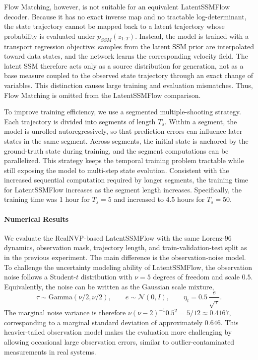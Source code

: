 Flow Matching, however, is not suitable for an equivalent LatentSSMFlow decoder. Because it has no exact inverse map and no tractable log-determinant, the state trajectory cannot be mapped back to a latent trajectory whose probability is evaluated under $p_{SSM}(z_{1:T})$. Instead, the model is trained with a transport regression objective: samples from the latent \ac{SSM} prior are interpolated toward data states, and the network learns the corresponding velocity field. The latent \ac{SSM} therefore acts only as a source distribution for generation, not as a base measure coupled to the observed state trajectory through an exact change of variables. This distinction causes large training and evaluation mismatches. Thus, Flow Matching is omitted from the LatentSSMFlow comparison.

To improve training efficiency, we use a segmented multiple-shooting strategy. Each trajectory is divided into segments of length $T_s$. Within a segment, the model is unrolled autoregressively, so that prediction errors can influence later states in the same segment. Across segments, the initial state is anchored by the ground-truth state during training, and the segment computations can be parallelized. This strategy keeps the temporal training problem tractable while still exposing the model to multi-step state evolution. Consistent with the increased sequential computation required by longer segments, the training time for LatentSSMFlow increases as the segment length increases. Specifically, the training time was 1 hour for \(T_s=5\) and increased to 4.5 hours for \(T_s=50\).

\paragraph{Numerical Results}
We evaluate the RealNVP-based LatentSSMFlow with the same Lorenz-96 dynamics, observation mask, trajectory length, and train-validation-test split as in the previous experiment. The main difference is the observation-noise model. To challenge the uncertainty modeling ability of LatentSSMFlow, the observation noise follows a Student-$t$ distribution with $\nu=5$ degrees of freedom and scale $0.5$. Equivalently, the noise can be written as the Gaussian scale mixture,
\begin{equation}
    \tau \sim \mathrm{Gamma}(\nu/2,\nu/2),\qquad
    e \sim \mathcal{N}(0,I),\qquad
    \eta_t = 0.5\,\frac{e}{\sqrt{\tau}}.
\end{equation}
The marginal noise variance is therefore $\nu(\nu-2)^{-1}0.5^2=5/12\approx0.4167$, corresponding to a marginal standard deviation of approximately $0.646$. This heavier-tailed observation model makes the evaluation more challenging by allowing occasional large observation errors, similar to outlier-contaminated measurements in real systems.

